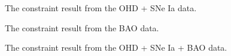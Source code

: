 \documentclass[twocolumn]{aastex631}
\begin{document}
   \begin{figure}[htbp]
      \centering
      \caption{The constraint result from the OHD + SNe Ia data.}
   \end{figure}

   \begin{figure}[htbp]
      \centering
      \caption{The constraint result from the BAO data.}
   \end{figure}

   \begin{figure}[htbp]
      \centering
      \caption{The constraint result from the OHD + SNe Ia + BAO data.}
   \end{figure}
\end{document}
